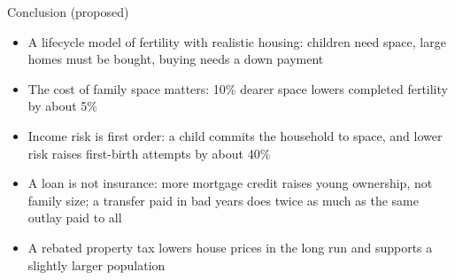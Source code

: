 \begin{frame}{Conclusion (proposed)}
\begin{itemize}\setlength\itemsep{1.0em}
  \item A lifecycle model of fertility with realistic housing: children need space, large homes must be bought, buying needs a down payment
  \item The cost of family space matters: 10\% dearer space lowers completed fertility by about 5\%
  \item Income risk is first order: a child commits the household to space, and lower risk raises first-birth attempts by about 40\%
  \item A loan is not insurance: more mortgage credit raises young ownership, not family size; a transfer paid in bad years does twice as much as the same outlay paid to all
  \item A rebated property tax lowers house prices in the long run and supports a slightly larger population
\end{itemize}
\end{frame}

